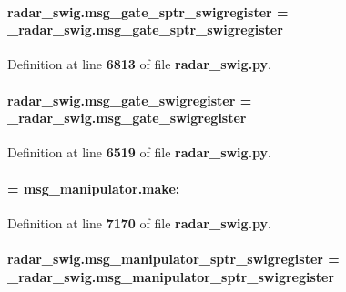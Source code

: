 \paragraph[{msg\+\_\+gate\+\_\+sptr\+\_\+swigregister}]{\setlength{\rightskip}{0pt plus 5cm}radar\+\_\+swig.\+msg\+\_\+gate\+\_\+sptr\+\_\+swigregister = \+\_\+radar\+\_\+swig.\+msg\+\_\+gate\+\_\+sptr\+\_\+swigregister}\label{namespaceradar__swig_a00edb6e55cbbb1ce29b2a6546534a193}


Definition at line {\bf 6813} of file {\bf radar\+\_\+swig.\+py}.

\paragraph[{msg\+\_\+gate\+\_\+swigregister}]{\setlength{\rightskip}{0pt plus 5cm}radar\+\_\+swig.\+msg\+\_\+gate\+\_\+swigregister = \+\_\+radar\+\_\+swig.\+msg\+\_\+gate\+\_\+swigregister}\label{namespaceradar__swig_a7f99067acfac63542f65d3627fb91d16}


Definition at line {\bf 6519} of file {\bf radar\+\_\+swig.\+py}.

\paragraph[{msg\+\_\+manipulator}]{ = {\bf msg\+\_\+manipulator.\+make};}\label{namespaceradar__swig_ae9d282673ab41d75a7a27319f38fe6ae}


Definition at line {\bf 7170} of file {\bf radar\+\_\+swig.\+py}.

\paragraph[{msg\+\_\+manipulator\+\_\+sptr\+\_\+swigregister}]{\setlength{\rightskip}{0pt plus 5cm}radar\+\_\+swig.\+msg\+\_\+manipulator\+\_\+sptr\+\_\+swigregister = \+\_\+radar\+\_\+swig.\+msg\+\_\+manipulator\+\_\+sptr\+\_\+swigregister}\label{namespaceradar__swig_adc2c15971c106846d732bcdec5261f4c}


